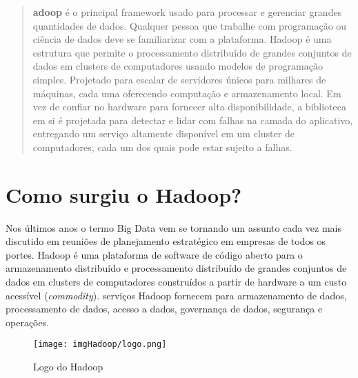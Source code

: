 \documentclass[a4paper,11pt]{article}
\begin{document}
	
\maketitle %
\thispagestyle{fancy} %


\begin{abstract}	
	\textbf{adoop\cite{hadoopoficial}} é o principal framework usado para processar e gerenciar grandes quantidades de dados. Qualquer pessoa que trabalhe com programação ou ciência de dados deve se familiarizar com a plataforma. Hadoop é uma estrutura que permite o processamento distribuído de grandes conjuntos de dados em clusters de computadores usando modelos de programação simples. Projetado para escalar de servidores únicos para milhares de máquinas, cada uma oferecendo computação e armazenamento local. Em vez de confiar no hardware para fornecer alta disponibilidade, a biblioteca em si é projetada para detectar e lidar com falhas na camada do aplicativo, entregando um serviço altamente disponível em um cluster de computadores, cada um dos quais pode estar sujeito a falhas.
\end{abstract}

\section{Como surgiu o Hadoop?}
Nos últimos anos o termo Big Data vem se tornando um assunto cada vez mais discutido em reuniões de planejamento estratégico em empresas de todos os portes. Hadoop é uma plataforma de software de código aberto para o armazenamento distribuído e processamento distribuído de grandes conjuntos de dados em clusters de computadores construídos a partir de hardware a um custo acessível (\textit{commodity}). serviços Hadoop fornecem para armazenamento de dados, processamento de dados, acesso a dados, governança de dados, segurança e operações.
\begin{figure}[H]
	\centering
	\texttt{[image: imgHadoop/logo.png]}
	\caption{Logo do Hadoop}
\end{figure}
\end{document}
